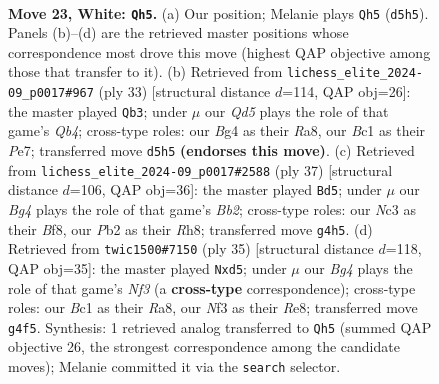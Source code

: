 \documentclass[11pt]{article}
\begin{document}
\clearpage

\begin{figure}[p]\centering
\begin{subfigure}{0.46\textwidth}\centering
\resizebox{\linewidth}{!}{%
\newchessgame
\chessboard[
  setfen={2bqrb1k/rp1p1p1p/p2np3/3Q4/P1PP2B1/2N2N2/1P3P1P/R1B2RK1 w - - 0 23},
  showmover=false,
  pgfstyle=straightmove, color=movearrow, markmove={d5-h5}
]}
\caption{}
\end{subfigure}\hfill
\begin{subfigure}{0.46\textwidth}\centering
\resizebox{\linewidth}{!}{%
\newchessgame
\chessboard[
  setfen={r2r2k1/1p2ppbp/2n3p1/pq6/P1b1B3/2P1BN2/1PQ2PPP/R3R1K1 b - - 0 17},
  showmover=false,
  pgfstyle=straightmove, color=movearrow, markmove={b5-b3}
]}
\caption{}
\end{subfigure}
\\[4pt]
\begin{subfigure}{0.46\textwidth}\centering
\resizebox{\linewidth}{!}{%
\newchessgame
\chessboard[
  setfen={2kr1b1r/pb3p2/4pP2/2p1n1B1/1pp1N2P/3q2P1/PP2QPB1/R3R1K1 b - - 0 19},
  showmover=false,
  pgfstyle=straightmove, color=movearrow, markmove={b7-d5}
]}
\caption{}
\end{subfigure}\hfill
\begin{subfigure}{0.46\textwidth}\centering
\resizebox{\linewidth}{!}{%
\newchessgame
\chessboard[
  setfen={r3r1k1/pp1n1pp1/4qn1p/2pP4/1b1P4/1P1QNPP1/P3P1BP/R1B2RK1 b - - 0 18},
  showmover=false,
  pgfstyle=straightmove, color=movearrow, markmove={f6-d5}
]}
\caption{}
\end{subfigure}
\caption{\textbf{Move 23, White: \texttt{Qh5}.} (a) Our position; Melanie plays \texttt{Qh5} (\texttt{d5h5}). Panels (b)--(d) are the retrieved master positions whose correspondence most drove this move (highest QAP objective among those that transfer to it). (b) Retrieved from \texttt{lichess\_elite\_2024-09\_p0017\#967} (ply 33) [structural distance $d$=114, QAP obj=26]: the master played \texttt{Qb3}; under $\mu$ our \emph{Qd5} plays the role of that game's \emph{Qb4}; cross-type roles: our \emph{B}g4 as their \emph{R}a8, our \emph{B}c1 as their \emph{P}e7; transferred move \texttt{d5h5} \textbf{(endorses this move)}. (c) Retrieved from \texttt{lichess\_elite\_2024-09\_p0017\#2588} (ply 37) [structural distance $d$=106, QAP obj=36]: the master played \texttt{Bd5}; under $\mu$ our \emph{Bg4} plays the role of that game's \emph{Bb2}; cross-type roles: our \emph{N}c3 as their \emph{B}f8, our \emph{P}b2 as their \emph{R}h8; transferred move \texttt{g4h5}. (d) Retrieved from \texttt{twic1500\#7150} (ply 35) [structural distance $d$=118, QAP obj=35]: the master played \texttt{Nxd5}; under $\mu$ our \emph{Bg4} plays the role of that game's \emph{Nf3} (a \textbf{cross-type} correspondence); cross-type roles: our \emph{B}c1 as their \emph{R}a8, our \emph{N}f3 as their \emph{R}e8; transferred move \texttt{g4f5}. Synthesis: 1 retrieved analog transferred to \texttt{Qh5} (summed QAP objective 26, the strongest correspondence among the candidate moves); Melanie committed it via the \texttt{search} selector.}
\label{fig:thought-m44}
\end{figure}
\end{document}
